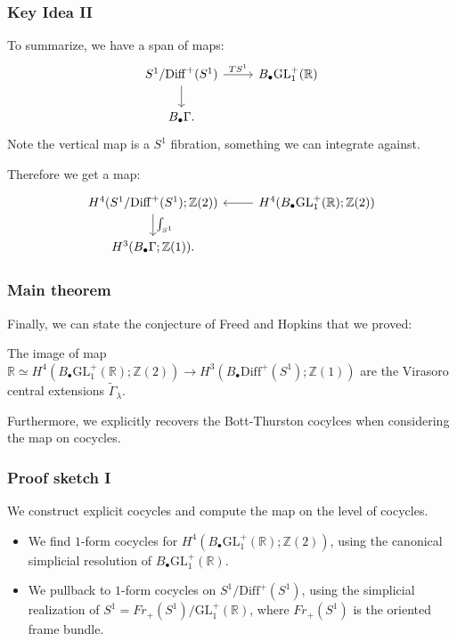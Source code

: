 \documentclass{beamer}
\newcommand{\Z}{\mathbb Z}
\newcommand{\R}{\mathbb R}
\newcommand{\GL}{\mathrm{GL}}
\newcommand{\Bdot}{B_\bullet}
\newcommand{\Diff}{\mathrm{Diff}^+(S^1)}
\newcommand{\tGam}{\widetilde\Gamma}
\begin{document}
\begin{frame}[fragile]
    \frametitle{Key Idea II}
    To summarize, we have a span of maps:
    \begin{equation}
        \begin{tikzcd}
        S^1/\Diff \arrow[r, "TS^1"] \arrow[d]
        & \Bdot\GL^+_1(\R) \\
        \Bdot\Gamma.
        & 
        \end{tikzcd}
        \end{equation}
    Note the vertical map is a $S^1$ fibration, something we can integrate against. 

    Therefore we get a map:
    \begin{equation}
        \begin{tikzcd}
        H^4(S^1/\Diff; \Z(2))  \arrow[d, "\int_{S^1}"]
        & H^4(\Bdot \GL^+_1(\R); \Z(2)) \arrow[l]\\
        H^3(\Bdot\Gamma; \Z(1)).
        & 
        \end{tikzcd}
        \end{equation} 
\end{frame}

\begin{frame}
    \frametitle{Main theorem}
    Finally, we can state the conjecture of Freed and Hopkins that we proved: \vspace{5mm}
    \begin{theorem}
        The image of map $\R \simeq H^4(\Bdot \GL^+_1(\R); \Z(2)) \to H^3(\Bdot\Diff; \Z(1))$
        are the Virasoro central extensions $\tGam_\lambda$.
    \end{theorem}

    \vspace{5mm} Furthermore, we explicitly recovers the Bott-Thurston cocylces when considering the 
    map on cocycles.
\end{frame}

\begin{frame}
    \frametitle{Proof sketch I}
    We construct explicit cocycles and compute the map on the 
    level of cocycles.
    \begin{itemize}
        \item <1 -> We find $1$-form cocycles for $H^4(\Bdot \GL^+_1(\R); \Z(2))$, 
        using the canonical simplicial resolution of $\Bdot \GL^+_1(\R)$.
        \item <2 -> We pullback to  $1$-form cocycles on $S^1/\Diff$, using the simplicial 
        realization of $S^1 = Fr_+(S^1)/\GL^+_1(\R)$, where $Fr_+(S^1)$ is the oriented frame bundle.
    \end{itemize}
\end{frame}
\end{document}
